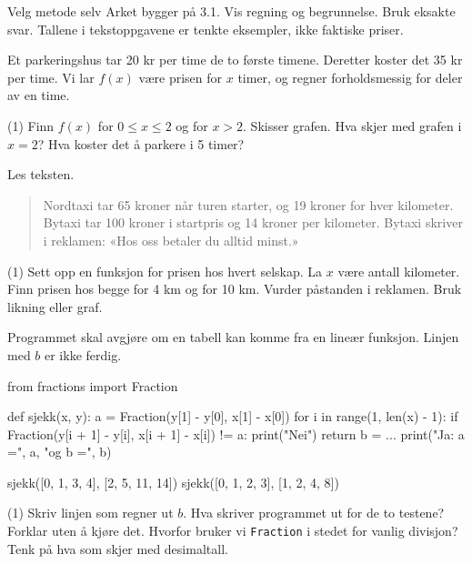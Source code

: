 
\begin{infoboks}{Velg metode selv}
Arket bygger på 3.1. Vis regning og begrunnelse. Bruk eksakte svar.
Tallene i tekstoppgavene er tenkte eksempler, ikke faktiske priser.
\end{infoboks}


Et parkeringshus tar 20 kr per time de to første timene. Deretter koster det 35 kr per time. Vi lar $f(x)$ være prisen for $x$ timer, og regner forholdsmessig for deler av en time.
\begin{tasks}(1)
  \task Finn $f(x)$ for $0 \le x \le 2$ og for $x > 2$.
  \task Skisser grafen. Hva skjer med grafen i $x = 2$?
  \task Hva koster det å parkere i 5 timer?
\end{tasks}

Les teksten.
\begin{quote}
Nordtaxi tar 65 kroner når turen starter, og 19 kroner for hver kilometer. Bytaxi tar 100 kroner i startpris og 14 kroner per kilometer.
Bytaxi skriver i reklamen: «Hos oss betaler du alltid minst.»
\end{quote}
\begin{tasks}(1)
  \task Sett opp en funksjon for prisen hos hvert selskap. La $x$ være antall kilometer.
  \task Finn prisen hos begge for 4 km og for 10 km.
  \task Vurder påstanden i reklamen. Bruk likning eller graf.
\end{tasks}

Programmet skal avgjøre om en tabell kan komme fra en lineær funksjon. Linjen med $b$ er ikke ferdig.
\begin{kode}
from fractions import Fraction

def sjekk(x, y):
    a = Fraction(y[1] - y[0], x[1] - x[0])
    for i in range(1, len(x) - 1):
        if Fraction(y[i + 1] - y[i], x[i + 1] - x[i]) != a:
            print("Nei")
            return
    b = ...
    print("Ja: a =", a, "og b =", b)

sjekk([0, 1, 3, 4], [2, 5, 11, 14])
sjekk([0, 1, 2, 3], [1, 2, 4, 8])
\end{kode}
\begin{tasks}(1)
  \task Skriv linjen som regner ut $b$.
  \task Hva skriver programmet ut for de to testene? Forklar uten å kjøre det.
  \task Hvorfor bruker vi \lstinline[style=laereverk,numbers=none,frame=none]|Fraction| i stedet for vanlig divisjon? Tenk på hva som skjer med desimaltall.
\end{tasks}

